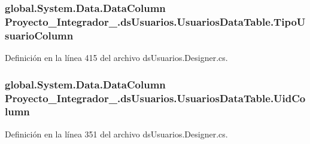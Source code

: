 \hypertarget{class_proyecto___integrador__3_1_1ds_usuarios_1_1_usuarios_data_table_a6aae61c3c800781623cde56fd7b1c930}{
\subsubsection[{Tipo\-Usuario\-Column}]{\setlength{\rightskip}{0pt plus 5cm}global.\-System.\-Data.\-Data\-Column Proyecto\-\_\-\-Integrador\-\_.\-ds\-Usuarios.\-Usuarios\-Data\-Table.\-Tipo\-Usuario\-Column\hspace{0.3cm}{\ttfamily [get]}}}\label{class_proyecto___integrador__3_1_1ds_usuarios_1_1_usuarios_data_table_a6aae61c3c800781623cde56fd7b1c930}


Definición en la línea 415 del archivo ds\-Usuarios.\-Designer.\-cs.

\hypertarget{class_proyecto___integrador__3_1_1ds_usuarios_1_1_usuarios_data_table_a35a1525ef5d75a20c0781c4163a53610}{
\subsubsection[{Uid\-Column}]{\setlength{\rightskip}{0pt plus 5cm}global.\-System.\-Data.\-Data\-Column Proyecto\-\_\-\-Integrador\-\_.\-ds\-Usuarios.\-Usuarios\-Data\-Table.\-Uid\-Column\hspace{0.3cm}{\ttfamily [get]}}}\label{class_proyecto___integrador__3_1_1ds_usuarios_1_1_usuarios_data_table_a35a1525ef5d75a20c0781c4163a53610}


Definición en la línea 351 del archivo ds\-Usuarios.\-Designer.\-cs.



